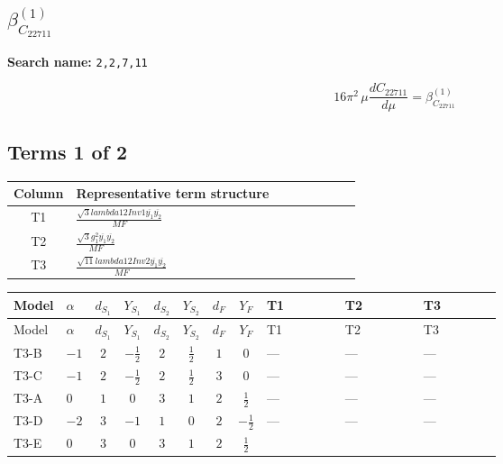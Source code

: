 \documentclass[8pt]{article}
\begin{document}
\begin{landscape}
\section*{$\beta_{C_{22711}}^{(1)}$}
\noindent\textbf{Search name: }\texttt{2,2,7,11}\par\smallskip
\[16\pi^2\,\mu\frac{d C_{22711}}{d\mu}=\beta_{C_{22711}}^{(1)}\]
\subsection*{Terms 1 of 2}
\begin{center}
\begin{tabular}{@{}c >{\raggedright\arraybackslash}p{0.82\linewidth}@{}}
\toprule
Column & Representative term structure \\
\midrule
T1 & \(\displaystyle \frac{\sqrt{3} lambda12Inv1 \overline{y_{1}} \overline{y_{2}}}{MF}\) \\
\midrule
T2 & \(\displaystyle \frac{\sqrt{3} g_{1}^{2} \overline{y_{1}} \overline{y_{2}}}{MF}\) \\
\midrule
T3 & \(\displaystyle \frac{\sqrt{11} lambda12Inv2 \overline{y_{1}} \overline{y_{2}}}{MF}\) \\
\midrule
\bottomrule
\end{tabular}
\end{center}
\smallskip
\tiny
\begin{longtable}{@{}llcccccc >{\raggedright\arraybackslash}p{0.21\linewidth} >{\raggedright\arraybackslash}p{0.21\linewidth} >{\raggedright\arraybackslash}p{0.21\linewidth}@{}}
\toprule
Model & $\alpha$ & $d_{S_1}$ & $Y_{S_1}$ & $d_{S_2}$ & $Y_{S_2}$ & $d_F$ & $Y_F$ & T1 & T2 & T3 \\
\midrule
\endfirsthead
\toprule
Model & $\alpha$ & $d_{S_1}$ & $Y_{S_1}$ & $d_{S_2}$ & $Y_{S_2}$ & $d_F$ & $Y_F$ & T1 & T2 & T3 \\
\midrule
\endhead
T3-B & $-1$ & $2$ & $-\frac{1}{2}$ & $2$ & $\frac{1}{2}$ & $1$ & $0$ & --- & --- & --- \\
\midrule
T3-C & $-1$ & $2$ & $-\frac{1}{2}$ & $2$ & $\frac{1}{2}$ & $3$ & $0$ & --- & --- & --- \\
\midrule
T3-A & $0$ & $1$ & $0$ & $3$ & $1$ & $2$ & $\frac{1}{2}$ & --- & --- & --- \\
\midrule
T3-D & $-2$ & $3$ & $-1$ & $1$ & $0$ & $2$ & $-\frac{1}{2}$ & --- & --- & --- \\
\midrule
T3-E & $0$ & $3$ & $0$ & $3$ & $1$ & $2$ & $\frac{1}{2}$ & \scriptsize\adjustbox{max width=\linewidth}{$\begin{gathered} - \frac{\sqrt{3} lambda12Inv1 \overline{y_{1}} \overline{y_{2}}}{6 MF}\end{gathered}$} & \scriptsize\adjustbox{max width=\linewidth}{$\begin{gathered} \frac{\sqrt{3} g_{1}^{2} \overline{y_{1}} \overline{y_{2}}}{8 MF}\end{gathered}$} & \scriptsize\adjustbox{max width=\linewidth}{$\begin{gathered} \frac{3 \sqrt{11} lambda12Inv2 \overline{y_{1}} \overline{y_{2}}}{22 MF}\end{gathered}$} \\

\end{longtable}
\end{landscape}
\end{document}
